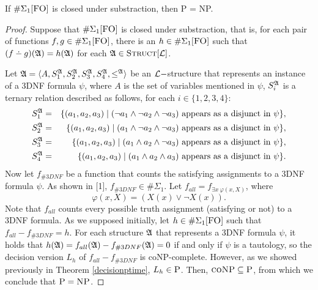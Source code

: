 \begin{theo}
If $\E1$ is closed under substraction, then {\sc P} = {\sc NP}.
\end{theo}
\begin{proof}
Suppose that $\E1$ is closed under substraction, that is, for each pair of functions $f,g\in \E1$, there is an $h\in\E1$ such that $(f\dotminus g)(\A) = h(\A)$ for each ${\frak A}\in\textsc{Struct}[{\cal L}]$.

Let ${\frak A} = \langle A, S_1^{\frak A}, S_2^{\frak A}, S_3^{\frak A}, S_4^{\frak A}, \leq^{\frak A} \rangle$ be an ${\cal L}-$structure that represents an instance of a 3DNF formula $\psi$, where $A$ is the set of variables mentioned in $\psi$, $S_i^{\frak A}$ is a ternary relation described as follows, for each $i\in\{1,2,3,4\}$:
\begin{eqnarray*}
S_1^{\frak A} &=& \{(a_1,a_2,a_3)\mid (\neg a_1 \wedge \neg a_2 \wedge \neg a_3) \mbox{ appears as a disjunct in }\psi\},\\
S_2^{\frak A} &=& \{(a_1,a_2,a_3)\mid ( a_1 \wedge \neg a_2 \wedge \neg a_3) \mbox{ appears as a disjunct in }\psi\},\\
S_3^{\frak A} &=& \{(a_1,a_2,a_3)\mid ( a_1 \wedge  a_2 \wedge \neg a_3) \mbox{ appears as a disjunct in }\psi\},\\
S_4^{\frak A} &=& \{(a_1,a_2,a_3)\mid ( a_1 \wedge  a_2 \wedge  a_3) \mbox{ appears as a disjunct in }\psi\}.
\end{eqnarray*}
Now let $f_{\#3DNF}$ be a function that counts the satisfying assignments to a 3DNF formula $\psi$. As shown in [1], $f_{\#3DNF} \in \#\Sigma_1$. Let $f_{all} = f_{\exists x\:\varphi(x,X)}$, where
$$
\varphi(x,X) = (X(x) \vee \neg X(x)).
$$
Note that $f_{all}$ counts every possible truth assignment (satisfying or not) to a 3DNF formula. As we supposed initially, let $h\in\E1$ such that $f_{all}-f_{\#3DNF} = h$. For each structure ${\frak A}$ that represents a 3DNF formula $\psi$, it holds that $h({\frak A}) = f_{all}({\frak A})-f_{\#3DNF}({\frak A}) = 0$ if and only if $\psi$ is a tautology, so the decision version $L_h$ of $f_{all}-f_{\#3DNF}$ is {\sc coNP}-complete. However, as we showed previously in Theorem \ref{decisionptime}, $L_h \in \textsc{P}$. Then, $\textsc{coNP} \subseteq \textsc{P}$, from which we conclude that $\textsc{P} = \textsc{NP}$.
\end{proof}